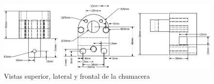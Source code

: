 \begin{figure}
\centering
\includegraphics[width=4.5in]{dibujos/chumacera}
\caption{Vistas superior, lateral y frontal de la chumacera}
\label{fig:fotos:chumacera}
\end{figure}
